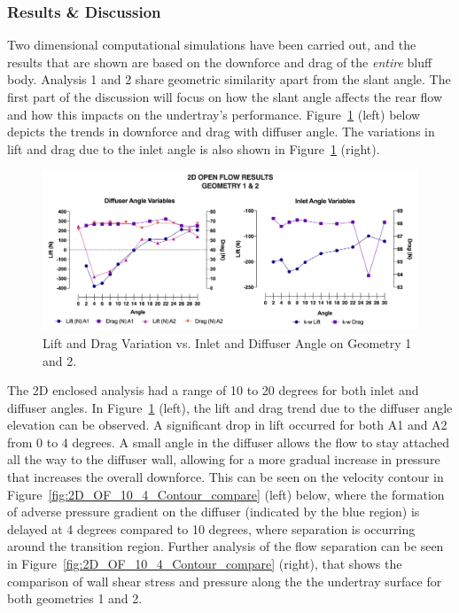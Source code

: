 \subsubsection{Results \& Discussion}

\noindent Two dimensional computational simulations have been carried out, and the results that are shown are based on the downforce and drag of the \textit{entire} bluff body. Analysis 1 and 2 share geometric similarity apart from the slant angle. The first part of the discussion will focus on how the slant angle affects the rear flow and how this impacts on the undertray's performance. Figure~\ref{fig:2D_OF_A12_results} (left) below depicts the trends in downforce and drag with diffuser angle. The variations in lift and drag due to the inlet angle is also shown in Figure~\ref{fig:2D_OF_A12_results} (right).

\begin{figure}[!ht]
    \centering
    \includegraphics[scale = 0.6]{Figures/Graph/2D_OF_A1-2.png}
    \caption{Lift and Drag Variation vs. Inlet and Diffuser Angle on Geometry 1 and 2.}
    \label{fig:2D_OF_A12_results}
\end{figure}

\noindent The 2D enclosed analysis had a range of 10 to 20 degrees for both inlet and diffuser angles. In Figure~\ref{fig:2D_OF_A12_results} (left), the lift and drag trend due to the diffuser angle elevation can be observed. A significant drop in lift occurred for both A1 and A2 from 0 to 4 degrees. A small angle in the diffuser allows the flow to stay attached all the way to the diffuser wall, allowing for a more gradual increase in pressure that increases the overall downforce. This can be seen on the velocity contour in Figure~\ref{fig:2D_OF_10_4_Contour_compare} (left) below, where the formation of adverse pressure gradient on the diffuser (indicated by the blue region) is delayed at 4 degrees compared to 10 degrees, where separation is occurring around the transition region. Further analysis of the flow separation can be seen in Figure~\ref{fig:2D_OF_10_4_Contour_compare} (right), that shows the comparison of wall shear stress and pressure along the the undertray surface for both geometries 1 and 2. 

